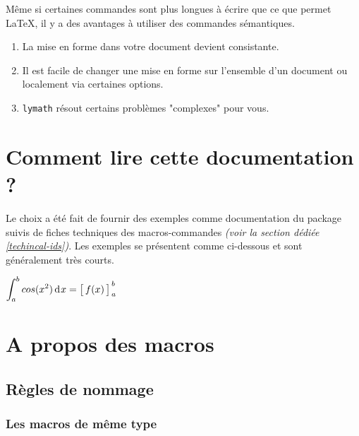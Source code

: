 \documentclass[12pt,a4paper]{article}
\theoremstyle{definition}
\begin{document}
Même si certaines commandes sont plus longues à écrire que ce que permet \LaTeX{}, il y a des avantages à utiliser des commandes sémantiques.
\begin{enumerate}
	\item La mise en forme dans votre document devient consistante.

	\item Il est facile de changer une mise en forme sur l'ensemble d'un document ou localement via certaines options.

	\item \verb+lymath+ résout certains problèmes "complexes" pour vous.
\end{enumerate}




\section{Comment lire cette documentation ?}

Le choix a été fait de fournir des exemples comme documentation du package suivis de fiches techniques des macros-commandes \emph{(voir la section dédiée \ref{techincal-ids})}. Les exemples se présentent comme ci-dessous et sont généralement très courts.

\begin{latexex}
$\dintegrate*{a}{b}{cos(x^2)}{x}
 =
 \hook*{a}{b}{f(x)}{x}$
\end{latexex}




\section{A propos des macros}

\subsection{Règles de nommage}

\subsubsection{Les macros de même \og type \fg}
\end{document}
